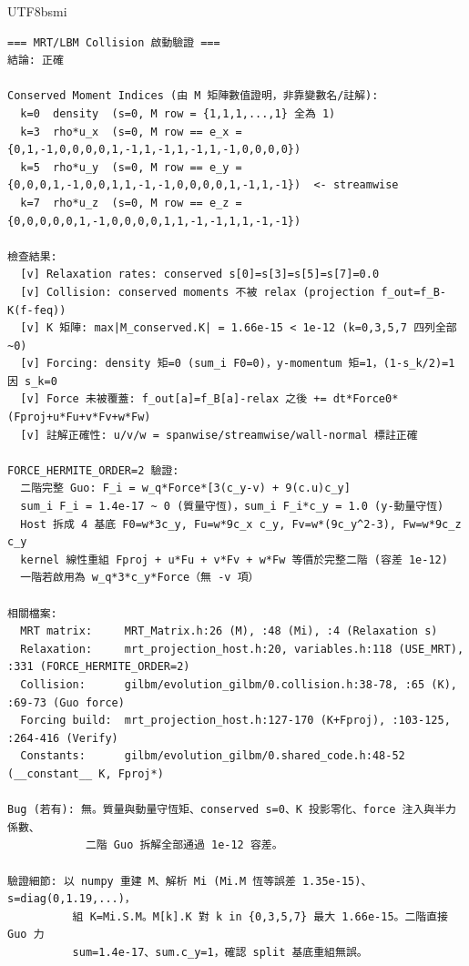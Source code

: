 \documentclass[11pt]{article}
\theoremstyle{definition}
\theoremstyle{remark}
\begin{document}
\begin{CJK}{UTF8}{bsmi}
\small
\begin{verbatim}
=== MRT/LBM Collision 啟動驗證 ===
結論: 正確

Conserved Moment Indices (由 M 矩陣數值證明，非靠變數名/註解):
  k=0  density  (s=0, M row = {1,1,1,...,1} 全為 1)
  k=3  rho*u_x  (s=0, M row == e_x = {0,1,-1,0,0,0,0,1,-1,1,-1,1,-1,1,-1,0,0,0,0})
  k=5  rho*u_y  (s=0, M row == e_y = {0,0,0,1,-1,0,0,1,1,-1,-1,0,0,0,0,1,-1,1,-1})  <- streamwise
  k=7  rho*u_z  (s=0, M row == e_z = {0,0,0,0,0,1,-1,0,0,0,0,1,1,-1,-1,1,1,-1,-1})

檢查結果:
  [v] Relaxation rates: conserved s[0]=s[3]=s[5]=s[7]=0.0
  [v] Collision: conserved moments 不被 relax (projection f_out=f_B-K(f-feq))
  [v] K 矩陣: max|M_conserved.K| = 1.66e-15 < 1e-12 (k=0,3,5,7 四列全部 ~0)
  [v] Forcing: density 矩=0 (sum_i F0=0)，y-momentum 矩=1，(1-s_k/2)=1 因 s_k=0
  [v] Force 未被覆蓋: f_out[a]=f_B[a]-relax 之後 += dt*Force0*(Fproj+u*Fu+v*Fv+w*Fw)
  [v] 註解正確性: u/v/w = spanwise/streamwise/wall-normal 標註正確

FORCE_HERMITE_ORDER=2 驗證:
  二階完整 Guo: F_i = w_q*Force*[3(c_y-v) + 9(c.u)c_y]
  sum_i F_i = 1.4e-17 ~ 0 (質量守恆)，sum_i F_i*c_y = 1.0 (y-動量守恆)
  Host 拆成 4 基底 F0=w*3c_y, Fu=w*9c_x c_y, Fv=w*(9c_y^2-3), Fw=w*9c_z c_y
  kernel 線性重組 Fproj + u*Fu + v*Fv + w*Fw 等價於完整二階 (容差 1e-12)
  一階若啟用為 w_q*3*c_y*Force（無 -v 項）

相關檔案:
  MRT matrix:     MRT_Matrix.h:26 (M), :48 (Mi), :4 (Relaxation s)
  Relaxation:     mrt_projection_host.h:20, variables.h:118 (USE_MRT), :331 (FORCE_HERMITE_ORDER=2)
  Collision:      gilbm/evolution_gilbm/0.collision.h:38-78, :65 (K), :69-73 (Guo force)
  Forcing build:  mrt_projection_host.h:127-170 (K+Fproj), :103-125, :264-416 (Verify)
  Constants:      gilbm/evolution_gilbm/0.shared_code.h:48-52 (__constant__ K, Fproj*)

Bug (若有): 無。質量與動量守恆矩、conserved s=0、K 投影零化、force 注入與半力係數、
            二階 Guo 拆解全部通過 1e-12 容差。

驗證細節: 以 numpy 重建 M、解析 Mi (Mi.M 恆等誤差 1.35e-15)、s=diag(0,1.19,...)，
          組 K=Mi.S.M。M[k].K 對 k in {0,3,5,7} 最大 1.66e-15。二階直接 Guo 力
          sum=1.4e-17、sum.c_y=1，確認 split 基底重組無誤。
\end{verbatim}
\end{CJK}
\end{document}
